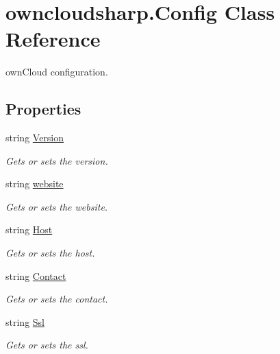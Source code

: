 \hypertarget{classowncloudsharp_1_1_config}{}\section{owncloudsharp.\+Config Class Reference}
\label{classowncloudsharp_1_1_config}


own\+Cloud configuration.  


\subsection*{Properties}
\begin{DoxyCompactItemize}
\item 
string \hyperlink{classowncloudsharp_1_1_config_ae1b02a97378b82d7d99b4f7467456aec}{Version}
\begin{DoxyCompactList}\small\item\em Gets or sets the version. \end{DoxyCompactList}\item 
string \hyperlink{classowncloudsharp_1_1_config_ab72c927b798b0924e5e099d1557f9dc0}{website}
\begin{DoxyCompactList}\small\item\em Gets or sets the website. \end{DoxyCompactList}\item 
string \hyperlink{classowncloudsharp_1_1_config_adf3604ef39a679dbaa980bf8d020d0a8}{Host}
\begin{DoxyCompactList}\small\item\em Gets or sets the host. \end{DoxyCompactList}\item 
string \hyperlink{classowncloudsharp_1_1_config_a11ba1d17f440c9ad512a2355ab1a5500}{Contact}
\begin{DoxyCompactList}\small\item\em Gets or sets the contact. \end{DoxyCompactList}\item 
string \hyperlink{classowncloudsharp_1_1_config_adbf71b12e814c4d8c6ae0f4de49099cf}{Ssl}
\begin{DoxyCompactList}\small\item\em Gets or sets the ssl. \end{DoxyCompactList}\end{DoxyCompactItemize}


